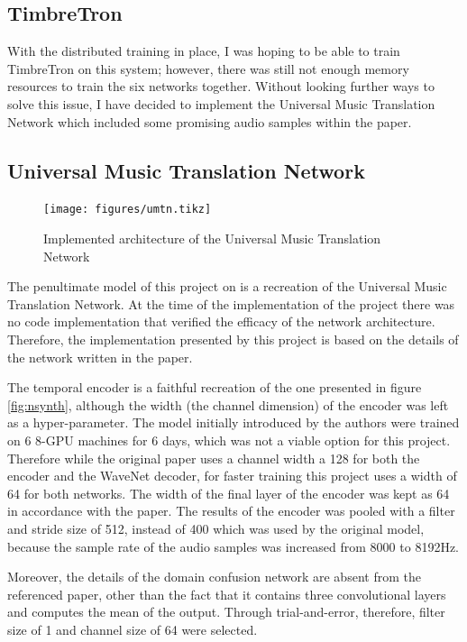 \documentclass[12pt,a4paper,]{report}
\begin{document}
\hypertarget{timbretron-1}{%
\subsection{TimbreTron}\label{timbretron-1}}

With the distributed training in place, I was hoping to be able to train
TimbreTron on this system; however, there was still not enough memory
resources to train the six networks together. Without looking further
ways to solve this issue, I have decided to implement the Universal
Music Translation Network which included some promising audio samples
within the paper.

\hypertarget{universal-music-translation-network-1}{%
\subsection{Universal Music Translation
Network}\label{universal-music-translation-network-1}}

\begin{figure}[h]
    \texttt{[image: figures/umtn.tikz]}
\centering 
\caption{Implemented architecture of the Universal Music Translation Network \label{fig:umtn}}
\end{figure}

The penultimate model of this project on is a recreation of the
Universal Music Translation Network. At the time of the implementation
of the project there was no code implementation that verified the
efficacy of the network architecture. Therefore, the implementation
presented by this project is based on the details of the network written
in the paper.

The temporal encoder is a faithful recreation of the one presented in
figure \ref{fig:nsynth}, although the width (the channel dimension) of
the encoder was left as a hyper-parameter. The model initially
introduced by the authors were trained on 6 8-GPU machines for 6 days,
which was not a viable option for this project. Therefore while the
original paper uses a channel width a 128 for both the encoder and the
WaveNet decoder, for faster training this project uses a width of 64 for
both networks. The width of the final layer of the encoder was kept as
64 in accordance with the paper. The results of the encoder was pooled
with a filter and stride size of 512, instead of 400 which was used by
the original model, because the sample rate of the audio samples was
increased from 8000 to 8192Hz.

Moreover, the details of the domain confusion network are absent from
the referenced paper, other than the fact that it contains three
convolutional layers and computes the mean of the output. Through
trial-and-error, therefore, filter size of 1 and channel size of 64 were
selected.
\end{document}
